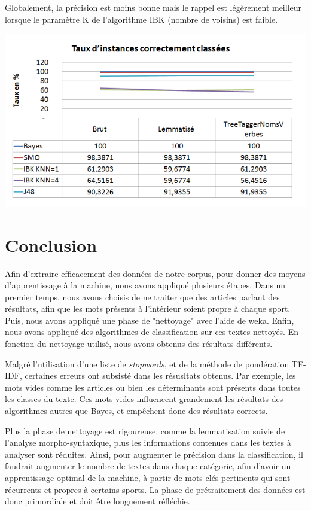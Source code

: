 \documentclass[a4paper,11pt]{article}
\begin{document}
Globalement, la précision est moins bonne mais le rappel est légèrement meilleur lorsque le paramètre K de l’algorithme IBK (nombre de voisins) est faible.

\begin{center}
\includegraphics[scale=0.4]{instClassees.png}
\end{center}

\newpage
\section{Conclusion}
Afin d'extraire efficacement des données de notre corpus, pour donner des moyens d'apprentissage à la machine, nous avons appliqué plusieurs étapes. Dans un premier temps, nous avons choisis de ne traiter que des articles parlant des résultats, afin que les mots présents à l'intérieur soient propre à chaque sport. Puis, nous avons appliqué une phase de "nettoyage" avec l'aide de weka. Enfin, nous avons appliqué des algorithmes de classification sur ces textes nettoyés. En fonction du nettoyage utilisé, nous avons obtenus des résultats différents.

Malgré l'utilisation d'une liste de \textit{stopwords}, et de la méthode de pondération TF-IDF, certaines erreurs ont subsisté dans les résusltats obtenus. Par exemple, les mots vides comme les articles ou bien les déterminants sont présents dans toutes les classes du texte. Ces mots vides influencent grandement les résultats des algorithmes autres que Bayes, et empêchent donc des résultats corrects.

Plus la phase de nettoyage est rigoureuse, comme la lemmatisation suivie de l'analyse morpho-syntaxique, plus les informations contenues dans les textes à analyser sont réduites. Ainsi, pour augmenter le précision dans la classification, il faudrait augmenter le nombre de textes dans chaque catégorie, afin d'avoir un apprentissage optimal de la machine, à partir de mots-clés pertinents qui sont récurrents et propres à certains sports. La phase de prétraitement des données est donc primordiale et doit être longuement réfléchie.
\end{document}
